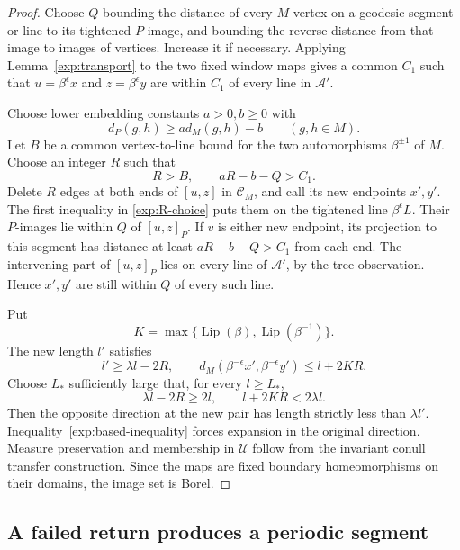 \begin{proof}
Choose $Q$ bounding the distance of every $M$-vertex on a geodesic
segment or line to its tightened $P$-image, and bounding the reverse
distance from that image to images of vertices. Increase it if
necessary. Applying Lemma~\ref{exp:transport} to the two fixed
window maps gives a common $C_1$ such that
$u=\beta^\epsilon x$ and $z=\beta^\epsilon y$ are within $C_1$
of every line in $\mathcal A'$.

Choose lower embedding constants $a>0,b\ge0$ with
\[
 d_P(g,h)\ge a d_M(g,h)-b\qquad(g,h\in M).
\]
Let $B$ be a common vertex-to-line bound for the two automorphisms
$\beta^{\pm1}$ of $M$. Choose an integer $R$ such that
\begin{equation}
 R>B,\qquad aR-b-Q>C_1.
 \label{exp:R-choice}
\end{equation}
Delete $R$ edges at both ends of $[u,z]$ in $\mathcal C_M$, and
call its new endpoints $x',y'$. The first inequality in
\eqref{exp:R-choice} puts them on the tightened line
$\beta^\epsilon L$. Their $P$-images lie within $Q$ of
$[u,z]_P$. If $v$ is either new endpoint, its projection to this
segment has distance at least $aR-b-Q>C_1$ from each end.
The intervening part of $[u,z]_P$ lies on every line of
$\mathcal A'$, by the tree observation. Hence $x',y'$ are still
within $Q$ of every such line.

Put
\[
 K=\max\{\operatorname{Lip}(\beta),
                 \operatorname{Lip}(\beta^{-1})\}.
\]
The new length $l'$ satisfies
\begin{equation}
 l'\ge\lambda l-2R,
 \qquad
 d_M(\beta^{-\epsilon}x',\beta^{-\epsilon}y')
 \le l+2KR.
 \label{exp:trim-estimates}
\end{equation}
Choose $L_*$ sufficiently large that, for every $l\ge L_*$,
\[
 \lambda l-2R\ge2l,
 \qquad l+2KR<2\lambda l.
\]
Then the opposite direction at the new pair has length strictly
less than $\lambda l'$. Inequality~\eqref{exp:based-inequality}
forces expansion in the original direction. Measure preservation
and membership in $\mathcal U$ follow from the invariant conull
transfer construction. Since the maps are fixed boundary
homeomorphisms on their domains, the image set is Borel.
\end{proof}

\subsection{A failed return produces a periodic segment}

